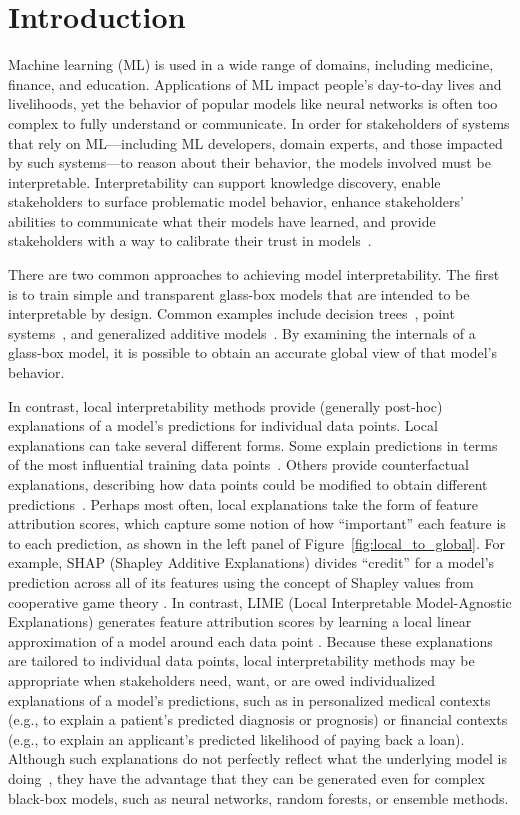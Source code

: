 \documentclass[11pt,dvipdfmx]{article}
\begin{document}
\section{Introduction}

Machine learning (ML) is used in a wide range of domains, including
medicine, finance, and education. Applications of ML impact people's
day-to-day lives and livelihoods, yet the behavior of popular models
like neural networks is often too complex to fully understand or
communicate.  In order for stakeholders of systems that rely on
ML---including ML developers, domain experts, and those impacted by
such systems---to reason about their behavior, the models involved
must be interpretable. Interpretability can support knowledge
discovery, enable stakeholders to surface problematic model behavior,
enhance stakeholders' abilities to communicate what their models have
learned, and provide stakeholders with a way to calibrate their trust
in models~\citep{Hullman,VW21}.

There are two common approaches to achieving model interpretability.
The first is to train simple and transparent glass-box models that are
intended to be interpretable by design.  Common examples include
decision trees~\citep{quinlan1986induction}, point
systems~\citep{zeng2017interpretable,jung2020simple}, and generalized
additive models~\citep{hastie1990generalized,Caruana2015-qf}. By
examining the internals of a glass-box model, it is possible to obtain
an accurate global view of that model's behavior.

In contrast, local interpretability methods provide (generally
post-hoc) explanations of a model's predictions for individual data
points. Local explanations can take several different forms.  Some
explain predictions in terms of the most influential training data
points~\citep[e.g.,][]{KL17}.  Others provide counterfactual
explanations, describing how data points could be modified to obtain
different predictions~\citep[e.g.,][]{R19b,USL19}.  Perhaps most
often, local explanations take the form of feature attribution scores,
which capture some notion of how ``important'' each feature is to each
prediction, as shown in the left panel of
Figure~\ref{fig:local_to_global}.  For example, SHAP (Shapley Additive
Explanations) divides ``credit'' for a model's prediction across all
of its features using the concept of Shapley values from cooperative
game theory \citep{SHAP}.  In contrast, LIME (Local Interpretable
Model-Agnostic Explanations) generates feature attribution scores by
learning a local linear approximation of a model around each data
point \citep{LIME}.  Because these explanations are tailored to
individual data points, local interpretability methods may be
appropriate when stakeholders need, want, or are owed individualized
explanations of a model's predictions, such as in personalized medical
contexts (e.g., to explain a patient's predicted diagnosis or
prognosis) or financial contexts (e.g., to explain an applicant's
predicted likelihood of paying back a loan). Although such
explanations do not perfectly reflect what the underlying model is
doing~\citep{rudin2019please,WB19}, they have the advantage that they
can be generated even for complex black-box models, such as neural
networks, random forests, or ensemble methods.
\end{document}

